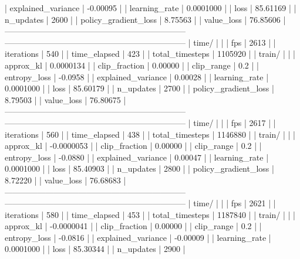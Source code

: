|    explained_variance   |     -0.00095 |
|    learning_rate        |    0.0001000 |
|    loss                 |     85.61169 |
|    n_updates            |         2600 |
|    policy_gradient_loss |      8.75563 |
|    value_loss           |     76.85606 |
------------------------------------------------------------------
------------------------------------------------------------------
| time/                   |              |
|    fps                  |         2613 |
|    iterations           |          540 |
|    time_elapsed         |          423 |
|    total_timesteps      |      1105920 |
| train/                  |              |
|    approx_kl            |    0.0000134 |
|    clip_fraction        |      0.00000 |
|    clip_range           |          0.2 |
|    entropy_loss         |      -0.0958 |
|    explained_variance   |      0.00028 |
|    learning_rate        |    0.0001000 |
|    loss                 |     85.60179 |
|    n_updates            |         2700 |
|    policy_gradient_loss |      8.79503 |
|    value_loss           |     76.80675 |
------------------------------------------------------------------
------------------------------------------------------------------
| time/                   |              |
|    fps                  |         2617 |
|    iterations           |          560 |
|    time_elapsed         |          438 |
|    total_timesteps      |      1146880 |
| train/                  |              |
|    approx_kl            |   -0.0000053 |
|    clip_fraction        |      0.00000 |
|    clip_range           |          0.2 |
|    entropy_loss         |      -0.0880 |
|    explained_variance   |      0.00047 |
|    learning_rate        |    0.0001000 |
|    loss                 |     85.40903 |
|    n_updates            |         2800 |
|    policy_gradient_loss |      8.72220 |
|    value_loss           |     76.68683 |
------------------------------------------------------------------
------------------------------------------------------------------
| time/                   |              |
|    fps                  |         2621 |
|    iterations           |          580 |
|    time_elapsed         |          453 |
|    total_timesteps      |      1187840 |
| train/                  |              |
|    approx_kl            |   -0.0000041 |
|    clip_fraction        |      0.00000 |
|    clip_range           |          0.2 |
|    entropy_loss         |      -0.0816 |
|    explained_variance   |     -0.00009 |
|    learning_rate        |    0.0001000 |
|    loss                 |     85.30344 |
|    n_updates            |         2900 |

